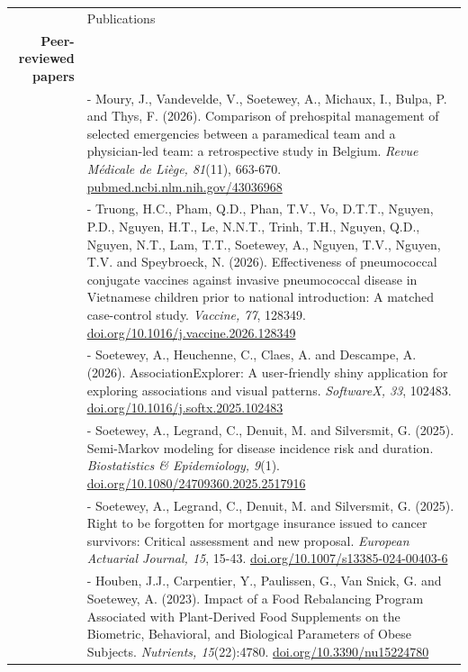 \documentclass[letterpaper, 11pt]{article}
\newcommand{\headingfont}{\Large\color{OliveGreen}}
\newenvironment{SectionTableSingleSpace}[1]{
	\renewcommand*{\arraystretch}{1.2}
	\setlength{\tabcolsep}{10pt}
	\begin{longtable}{Rp{5.2in}} & #1 \\[0.6em]}
{\end{longtable}\vspace{-.3cm}}
\begin{document}
\begin{SectionTableSingleSpace}{\headingfont Publications}
\textbf{Peer-reviewed papers}\\
& - Moury, J., Vandevelde, V., Soetewey, A., Michaux, I., Bulpa, P. and Thys, F. (2026). Comparison of prehospital management of selected emergencies between a paramedical team and a physician-led team: a retrospective study in Belgium. \textit{Revue Médicale de Liège, 81}(11), 663-670. \href{https://pubmed.ncbi.nlm.nih.gov/43036968/}{pubmed.ncbi.nlm.nih.gov/43036968}\\
& - Truong, H.C., Pham, Q.D., Phan, T.V., Vo, D.T.T., Nguyen, P.D., Nguyen, H.T., Le, N.N.T., Trinh, T.H., Nguyen, Q.D., Nguyen, N.T., Lam, T.T., Soetewey, A., Nguyen, T.V., Nguyen, T.V. and Speybroeck, N. (2026). Effectiveness of pneumococcal conjugate vaccines against invasive pneumococcal disease in Vietnamese children prior to national introduction: A matched case-control study. \textit{Vaccine, 77}, 128349. \href{https://doi.org/10.1016/j.vaccine.2026.128349}{doi.org/10.1016/j.vaccine.2026.128349}\\
& - Soetewey, A., Heuchenne, C., Claes, A. and Descampe, A. (2026). AssociationExplorer: A user-friendly shiny application for exploring associations and visual patterns. \textit{SoftwareX, 33}, 102483. \href{https://doi.org/10.1016/j.softx.2025.102483}{doi.org/10.1016/j.softx.2025.102483}\\
& - Soetewey, A., Legrand, C., Denuit, M. and Silversmit, G. (2025). Semi-Markov modeling for disease incidence risk and duration. \textit{Biostatistics \& Epidemiology, 9}(1). \href{https://doi.org/10.1080/24709360.2025.2517916}{doi.org/10.1080/24709360.2025.2517916}\\
& - Soetewey, A., Legrand, C., Denuit, M. and Silversmit, G. (2025). Right to be forgotten for mortgage insurance issued to cancer survivors: Critical assessment and new proposal. \textit{European Actuarial Journal, 15}, 15-43. \href{https://doi.org/10.1007/s13385-024-00403-6}{doi.org/10.1007/s13385-024-00403-6}\\
& - Houben, J.J., Carpentier, Y., Paulissen, G., Van Snick, G. and Soetewey, A. (2023). Impact of a Food Rebalancing Program Associated with Plant-Derived Food Supplements on the Biometric, Behavioral, and Biological Parameters of Obese Subjects. \textit{Nutrients, 15}(22):4780. \href{https://doi.org/10.3390/nu15224780}{doi.org/10.3390/nu15224780}\\

\end{SectionTableSingleSpace}
\end{document}
